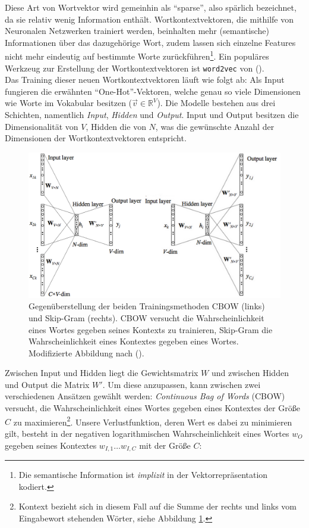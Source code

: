 Diese Art von Wortvektor wird gemeinhin als ``sparse'', also spärlich bezeichnet, da sie relativ wenig Information enthält.
Wortkontextvektoren, die mithilfe von Neuronalen Netzwerken trainiert werden, beinhalten mehr (semantische) Informationen über das dazugehörige Wort, zudem lassen sich einzelne Features
nicht mehr eindeutig auf bestimmte Worte zurückführen\footnote{Die semantische Information ist \emph{implizit} in der
Vektorrepräsentation kodiert.}. Ein populäres Werkzeug zur Erstellung der Wortkontextvektoren ist \verb|word2vec| von
(\cite{mikolov2013efficient}).\\

Das Training dieser neuen Wortkontextvektoren läuft wie folgt ab:
Als Input fungieren die erwähnten ``One-Hot''-Vektoren, welche genau so viele Dimensionen wie Worte im Vokabular besitzen
($\vec{v} \in \mathbb{R}^V$).
Die Modelle bestehen aus drei Schichten, namentlich \emph{Input}, \emph{Hidden} und \emph{Output}.
Input und Output besitzen die Dimensionalität von $V$, Hidden die von $N$, was die gewünschte Anzahl der Dimensionen der
Wortkontextvektoren entspricht.\\

\begin{figure}[h]
  \centering
  \includegraphics[width=1.1\textwidth]{../img/cbowskip.png}
  \caption[Gegenüberstellung von Skip-Gram und CBOW]{Gegenüberstellung der beiden Trainingsmethoden CBOW (links)
  und Skip-Gram (rechts). CBOW versucht die Wahrscheinlichkeit eines Wortes gegeben seines Kontexts zu trainieren,
  Skip-Gram die Wahrscheinlichkeit eines Kontextes gegeben eines Wortes. Modifizierte Abbildung nach
  (\cite{rong2014word2vec}).\label{fig:cbowskip}}
\end{figure}

Zwischen Input und Hidden liegt die Gewichtsmatrix $W$ und zwischen Hidden und Output die Matrix $W'$.
Um diese anzupassen, kann zwischen zwei verschiedenen Ansätzen gewählt werden:
\emph{Continuous Bag of Words} (CBOW) versucht, die Wahrscheinlichkeit eines Wortes gegeben eines Kontextes
der Größe $C$ zu maximieren\footnote{Kontext bezieht sich in diesem Fall auf die Summe der rechts und links vom Eingabewort stehenden
Wörter, siehe Abbildung \ref{fig:cbowskip}.}. Unsere Verlustfunktion, deren Wert es dabei zu minimieren gilt,
besteht in der negativen logarithmischen Wahrscheinlichkeit eines Wortes $w_O$ gegeben seines Kontextes
$w_{I, 1} \ldots w_{I,C}$ mit der Größe $C$:

